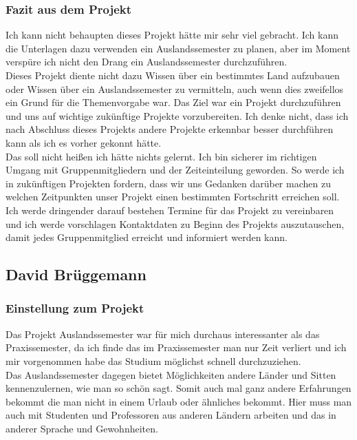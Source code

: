 \documentclass[11pt]{article}
\begin{document}
\subsubsection{Fazit aus dem Projekt}

Ich kann nicht behaupten dieses Projekt hätte mir sehr viel gebracht. Ich kann die Unterlagen dazu verwenden ein Auslandssemester zu planen, aber im Moment verspüre ich nicht den Drang ein Auslandssemester durchzuführen.  \\
Dieses Projekt diente nicht dazu Wissen über ein bestimmtes Land aufzubauen oder Wissen über ein Auslandssemester zu vermitteln, auch wenn dies zweifellos ein Grund für die Themenvorgabe war. Das Ziel war ein Projekt durchzuführen und uns auf wichtige zukünftige Projekte vorzubereiten. Ich denke nicht, dass ich nach Abschluss dieses Projekts andere Projekte erkennbar besser durchführen kann als ich es vorher gekonnt hätte.\\
Das soll nicht heißen ich hätte nichts gelernt. Ich bin sicherer im richtigen Umgang mit Gruppenmitgliedern und der Zeiteinteilung geworden. So werde ich in zukünftigen Projekten fordern, dass wir uns Gedanken darüber machen zu welchen Zeitpunkten unser Projekt einen bestimmten Fortschritt erreichen soll. Ich werde dringender darauf bestehen Termine für das Projekt zu vereinbaren und ich werde vorschlagen Kontaktdaten zu Beginn des Projekts auszutauschen, damit jedes Gruppenmitglied erreicht und informiert werden kann.

\subsection{David Brüggemann}
\subsubsection{Einstellung zum Projekt}
Das Projekt Auslandssemester war für mich durchaus interessanter als das Praxissemester, da ich finde das im Praxissemester man nur Zeit verliert und ich mir vorgenommen habe das Studium möglichst schnell durchzuziehen. \\ Das Auslandssemester dagegen bietet Möglichkeiten andere Länder und Sitten kennenzulernen, wie man so schön sagt. Somit auch mal ganz andere Erfahrungen bekommt die man nicht in einem Urlaub oder ähnliches bekommt. Hier muss man auch mit Studenten und Professoren aus anderen Ländern arbeiten und das in anderer Sprache und Gewohnheiten.
\end{document}
